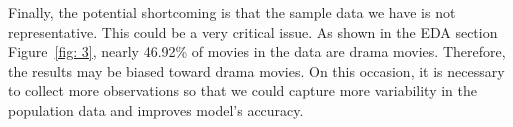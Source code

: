 \documentclass{article}
\begin{document}
Finally, the potential shortcoming is that the sample data we have is not representative. This could be a very critical issue. As shown in the EDA section Figure~\ref{fig: 3}, nearly 46.92\% of movies in the data are drama movies. Therefore, the results may be biased toward drama movies. On this occasion, it is necessary to collect more observations so that we could capture more variability in the population data and improves model's accuracy. 
\newpage


\end{document}
